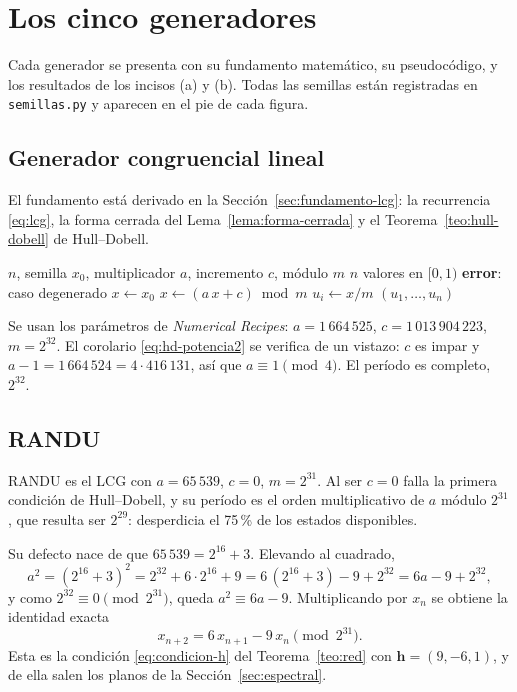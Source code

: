 \section{Los cinco generadores}
\label{sec:generadores}

Cada generador se presenta con su fundamento matemático, su pseudocódigo, y los
resultados de los incisos (a) y (b). Todas las semillas están registradas en
\texttt{semillas.py} y aparecen en el pie de cada figura.

\subsection{Generador congruencial lineal}

El fundamento está derivado en la Sección~\ref{sec:fundamento-lcg}: la
recurrencia \eqref{eq:lcg}, la forma cerrada del
Lema~\ref{lema:forma-cerrada} y el Teorema~\ref{teo:hull-dobell} de
Hull--Dobell.

\begin{algorithm}[H]
\caption{Generador congruencial lineal}
\begin{algorithmic}[1]
\Require $n$, semilla $x_0$, multiplicador $a$, incremento $c$, módulo $m$
\Ensure $n$ valores en $[0,1)$
  \State \textbf{error}: caso degenerado
\EndIf
\State $x \gets x_0$
  \State $x \gets (a\,x + c) \bmod m$
  \State $u_i \gets x / m$
\EndFor
\State \Return $(u_1,\dots,u_n)$
\end{algorithmic}
\end{algorithm}

Se usan los parámetros de \emph{Numerical Recipes}: $a = 1\,664\,525$,
$c = 1\,013\,904\,223$, $m = 2^{32}$. El corolario
\eqref{eq:hd-potencia2} se verifica de un vistazo: $c$ es impar y
$a - 1 = 1\,664\,524 = 4\cdot416\,131$, así que $a \equiv 1 \pmod 4$. El
período es completo, $2^{32}$.

\subsection{RANDU}

RANDU es el LCG con $a = 65\,539$, $c = 0$, $m = 2^{31}$. Al ser $c = 0$ falla
la primera condición de Hull--Dobell, y su período es el orden multiplicativo
de $a$ módulo $2^{31}$, que resulta ser $2^{29}$: desperdicia el 75\,\% de
los estados disponibles.

Su defecto nace de que $65\,539 = 2^{16}+3$. Elevando al cuadrado,
\[
  a^2 = (2^{16}+3)^2 = 2^{32} + 6\cdot 2^{16} + 9
      = 6\,(2^{16}+3) - 9 + 2^{32} = 6a - 9 + 2^{32},
\]
y como $2^{32} \equiv 0 \pmod{2^{31}}$, queda $a^2 \equiv 6a - 9$. Multiplicando
por $x_n$ se obtiene la identidad exacta
\begin{equation}
  x_{n+2} = 6\,x_{n+1} - 9\,x_n \pmod{2^{31}} .
  \label{eq:identidad-randu}
\end{equation}
Esta es la condición \eqref{eq:condicion-h} del Teorema~\ref{teo:red} con
$\mathbf{h} = (9,-6,1)$, y de ella salen los planos de la
Sección~\ref{sec:espectral}.

